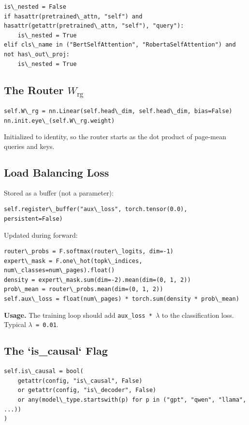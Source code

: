 \begin{lstlisting}
is\_nested = False
if hasattr(pretrained\_attn, "self") and hasattr(getattr(pretrained\_attn, "self"), "query"):
    is\_nested = True
elif cls\_name in ("BertSelfAttention", "RobertaSelfAttention") and not has\_out\_proj:
    is\_nested = True
\end{lstlisting}

\subsection{The Router $W_\text{rg}$}

\begin{lstlisting}
self.W\_rg = nn.Linear(self.head\_dim, self.head\_dim, bias=False)
nn.init.eye\_(self.W\_rg.weight)
\end{lstlisting}

Initialized to identity, so the router starts as the dot product of page-mean 
queries and keys.

\subsection{Load Balancing Loss}

Stored as a buffer (not a parameter):

\begin{lstlisting}
self.register\_buffer("aux\_loss", torch.tensor(0.0), persistent=False)
\end{lstlisting}

Updated during forward:

\begin{lstlisting}
router\_probs = F.softmax(router\_logits, dim=-1)
expert\_mask = F.one\_hot(topk\_indices, num\_classes=num\_pages).float()
density = expert\_mask.sum(dim=-2).mean(dim=(0, 1, 2))
prob\_mean = router\_probs.mean(dim=(0, 1, 2))
self.aux\_loss = float(num\_pages) * torch.sum(density * prob\_mean)
\end{lstlisting}

\textbf{Usage.} The training loop should add \texttt{aux\_loss * $\lambda$} to the classification 
loss. Typical \texttt{$\lambda$ = 0.01}.

\subsection{The `is\_causal` Flag}

\begin{lstlisting}
self.is\_causal = bool(
    getattr(config, "is\_causal", False)
    or getattr(config, "is\_decoder", False)
    or any(model\_type.startswith(p) for p in ("gpt", "qwen", "llama", ...))
)
\end{lstlisting}

